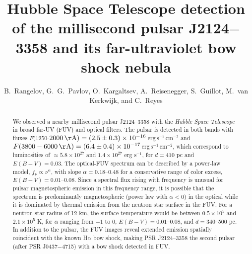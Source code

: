 \documentclass[iop]{emulateapj}
\begin{document}
\title{Hubble Space Telescope detection of the millisecond pulsar J2124$-$3358 and its far-ultraviolet bow shock nebula}


\author{B.\ Rangelov, G.\ G.\ Pavlov, O.\ Kargaltsev,  A.\ Reisenegger, S.\ Guillot, M.\ van Kerkwijk, and C.\ Reyes}



\begin{abstract}

We observed a nearby millisecond pulsar J2124--3358 with the {\sl Hubble Space Telescope} in broad far-UV (FUV) and optical filters. The pulsar is detected in both bands with fluxes  $F(1250$-$2000\,{\rm \AA})= (2.5\pm 0.3)\times10^{-16}$\,erg\,s$^{-1}$\,cm$^{-2}$ and $F(3800-6000\,{\rm \AA})=(6.4\pm0.4)\times10^{-17}$\,erg\,s$^{-1}$\,cm$^{-2}$, which correspond to luminosities of $\approx 5.8\times 10^{27}$ and $1.4\times 10^{27}$ erg s$^{-1}$, for $d=410$ pc and $E(B-V)=0.03$. The optical-FUV spectrum can be described by a power-law  model, $f_\nu\propto \nu^{\alpha}$, with slope $\alpha=0.18$--0.48 for a conservative range of color excess, $E(B-V)=0.01$--0.08. Since a spectral flux rising with frequency is unusual for pulsar magnetospheric emission in this frequency range, it is possible that the spectrum is predominantly magnetospheric (power law with $\alpha <0$) in the optical while it is dominated by thermal emission from the neutron star surface in the FUV. For a neutron star radius of 12 km, the surface temperature would be between $0.5\times 10^5$ and $2.1\times 10^5$ K, for $\alpha$ ranging from $-1$ to 0, $E(B-V)=0.01$--0.08, and $d=340$--500 pc. In addition to the pulsar, the FUV images reveal extended emission spatially coincident with the known H$\alpha$ bow shock, making PSR J2124--3358 the second pulsar (after PSR J0437$-$4715) with a bow shock detected in FUV.
 
\end{abstract}
\end{document}
